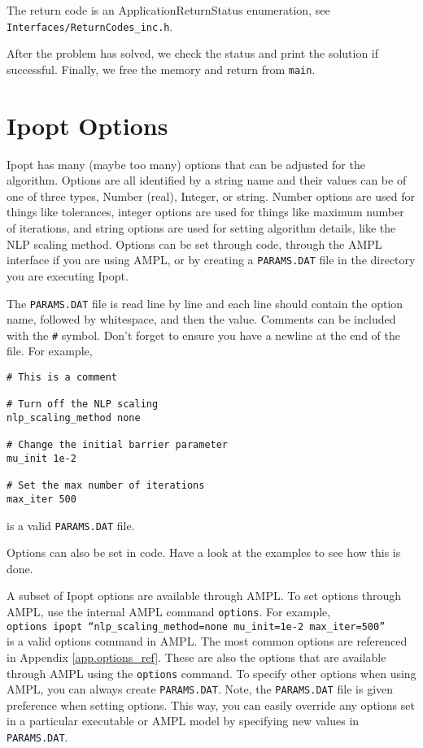 \documentclass[letter,10pt]{article}
\begin{document}
{The return code is an ApplicationReturnStatus enumeration, see {\tt
Interfaces/ReturnCodes\_inc.h}.

After the problem has solved, we check the status and print the solution if 
successful. Finally, we free the memory and return from {\tt main}.

\section{Ipopt Options}\label{sec.options}
Ipopt has many (maybe too many) options that can be adjusted for the
algorithm.  Options are all identified by a string name and their
values can be of one of three types, Number (real), Integer, or
string. Number options are used for things like tolerances, integer
options are used for things like maximum number of iterations, and
string options are used for setting algorithm details, like the NLP
scaling method. Options can be set through code, through the AMPL
interface if you are using AMPL, or by creating a {\tt PARAMS.DAT}
file in the directory you are executing Ipopt.

The {\tt PARAMS.DAT} file is read line by line and each line should
contain the option name, followed by whitespace, and then the
value. Comments can be included with the {\tt \#} symbol. Don't forget
to ensure you have a newline at the end of the file. For example,
\begin{verbatim}
# This is a comment

# Turn off the NLP scaling
nlp_scaling_method none

# Change the initial barrier parameter
mu_init 1e-2

# Set the max number of iterations
max_iter 500

\end{verbatim}
is a valid {\tt PARAMS.DAT} file.

Options can also be set in code. Have a look at the examples to see
how this is done. 

A subset of Ipopt options are available through AMPL. To set options
through AMPL, use the internal AMPL command {\tt options}.  For
example, \\ 
{\tt options ipopt ``nlp\_scaling\_method=none mu\_init=1e-2
max\_iter=500''} \\ 
is a valid options command in AMPL. The most common
options are referenced in Appendix \ref{app.options_ref}. These are also
the options that are available through AMPL using the {\tt options}
command. To specify other options when using AMPL, you can always
create {\tt PARAMS.DAT}.  Note, the {\tt PARAMS.DAT} file is given
preference when setting options. This way, you can easily override any
options set in a particular executable or AMPL model by specifying new
values in {\tt PARAMS.DAT}.

}
\end{document}
